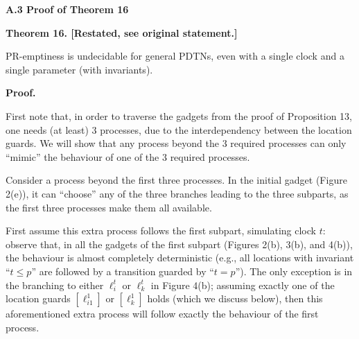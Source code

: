  
\par\medskip\noindent\textbf{A.3 Proof of Theorem 16}\par
 
 
 
\par\medskip\noindent\textbf{Theorem 16. [Restated, see original statement.]}\par
 
 
PR-emptiness is undecidable for general PDTNs, even with a single clock and a single parameter (with invariants).\par
 
 
 
 
 
\par\medskip\noindent\textbf{Proof.}\par
 
 
First note that, in order to traverse the gadgets from the proof of Proposition 13, one needs (at least) 3 processes, due to the interdependency between the location guards. We will show that any process beyond the 3 required processes can only “mimic” the behaviour of one of the 3 required processes.\par
 
 
 
Consider a process beyond the first three processes. In the initial gadget (Figure 2(e)), it can “choose” any of the three branches leading to the three subparts, as the first three processes make them all available.\par
 
 
 
First assume this extra process follows the first subpart, simulating clock $t$: observe that, in all the gadgets of the first subpart (Figures 2(b), 3(b), and 4(b)), the behaviour is almost completely deterministic (e.g., all locations with invariant “$t\leq p$” are followed by a transition guarded by “$t=p$”). The only exception is in the branching to either $\mathrm{\mathrm{\ell}}_{i}^{t}$ or $\mathrm{\mathrm{\ell}}_{k}^{t}$ in Figure 4(b); assuming exactly one of the location guards $[\mathrm{\mathrm{\ell}}_{i1}^{1}]$ or $[\mathrm{\mathrm{\ell}}_{k}^{1}]$ holds (which we discuss below), then this aforementioned extra process will follow exactly the behaviour of the first process.\par
 

